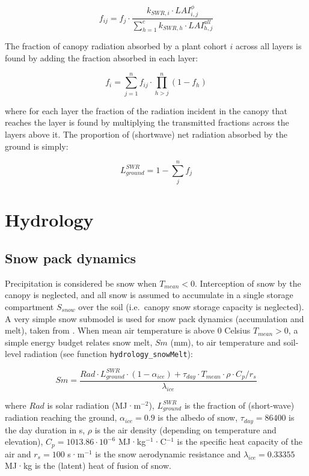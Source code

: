 \documentclass[]{book}
\begin{document}
\begin{equation}
f_{ij} = f_j \cdot \frac{k_{SWR,i}\cdot LAI_{i,j}^{\phi}}{\sum_{h=1}^{c}{k_{SWR,h} \cdot LAI_{h,j}^{all}}}
\end{equation}

The fraction of canopy radiation absorbed by a plant cohort \(i\) across
all layers is found by adding the fraction absorbed in each layer:

\begin{equation}
f_i = \sum_{j=1}^{n}{f_{ij}\cdot \prod_{h>j}^{n}{(1-f_h)}}
\end{equation}

where for each layer the fraction of the radiation incident in the
canopy that reaches the layer is found by multiplying the transmitted
fractions across the layers above it. The proportion of (shortwave) net
radiation absorbed by the ground is simply:

\begin{equation}
L^{SWR}_{ground} = 1 - \sum_{j}^{n}{f_j}
\end{equation}

\chapter{Hydrology}\label{hydrology}

\section{Snow pack dynamics}\label{snowpack}

Precipitation is considered be snow when \(T_{mean}<0\). Interception of
snow by the canopy is neglected, and all snow is assumed to accumulate
in a single storage compartment \(S_{snow}\) over the soil (i.e.~canopy
snow storage capacity is neglected). A very simple snow submodel is used
for snow pack dynamics (accumulation and melt), taken from
\citet{Kergoat1998}. When mean air temperature is above 0 Celsius
\(T_{mean}>0\), a simple energy budget relates snow melt, \(Sm\) (mm),
to air temperature and soil-level radiation (see function
\texttt{hydrology\_snowMelt}):

\begin{equation}
Sm = \frac{Rad\cdot L^{SWR}_{ground}\cdot (1-\alpha_{ice}) + \tau_{day} \cdot T_{mean} \cdot \rho \cdot C_p/r_{s}}{\lambda_{ice}}
\end{equation}

where \(Rad\) is solar radiation (MJ·m\(^{-2}\)), \(L^{SWR}_{ground}\)
is the fraction of (short-wave) radiation reaching the ground,
\(\alpha_{ice} = 0.9\) is the albedo of snow, \(\tau_{day} = 86400\) is
the day duration in s, \(\rho\) is the air density (depending on
temperature and elevation), \(C_{p} = 1013.86 \cdot 10^{-6}\)
MJ·kg\(^{-1}\)·C\(^{-1}\) is the specific heat capacity of the air and
\(r_{s} = 100\) s·m\(^{-1}\) is the snow aerodynamic resistance and
\(\lambda_{ice} = 0.33355\)MJ·kg is the (latent) heat of fusion of snow.
\end{document}
